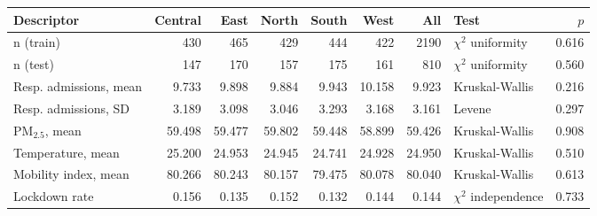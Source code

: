 \begin{tabular}{lrrrrrrlr}
\toprule
Descriptor & Central & East & North & South & West & All & Test & $p$ \\
\midrule
n (train) & 430 & 465 & 429 & 444 & 422 & 2190 & $\chi^2$ uniformity & 0.616 \\
n (test) & 147 & 170 & 157 & 175 & 161 & 810 & $\chi^2$ uniformity & 0.560 \\
Resp. admissions, mean & 9.733 & 9.898 & 9.884 & 9.943 & 10.158 & 9.923 & Kruskal-Wallis & 0.216 \\
Resp. admissions, SD & 3.189 & 3.098 & 3.046 & 3.293 & 3.168 & 3.161 & Levene & 0.297 \\
PM$_{2.5}$, mean & 59.498 & 59.477 & 59.802 & 59.448 & 58.899 & 59.426 & Kruskal-Wallis & 0.908 \\
Temperature, mean & 25.200 & 24.953 & 24.945 & 24.741 & 24.928 & 24.950 & Kruskal-Wallis & 0.510 \\
Mobility index, mean & 80.266 & 80.243 & 80.157 & 79.475 & 80.078 & 80.040 & Kruskal-Wallis & 0.613 \\
Lockdown rate & 0.156 & 0.135 & 0.152 & 0.132 & 0.144 & 0.144 & $\chi^2$ independence & 0.733 \\
\bottomrule
\end{tabular}
